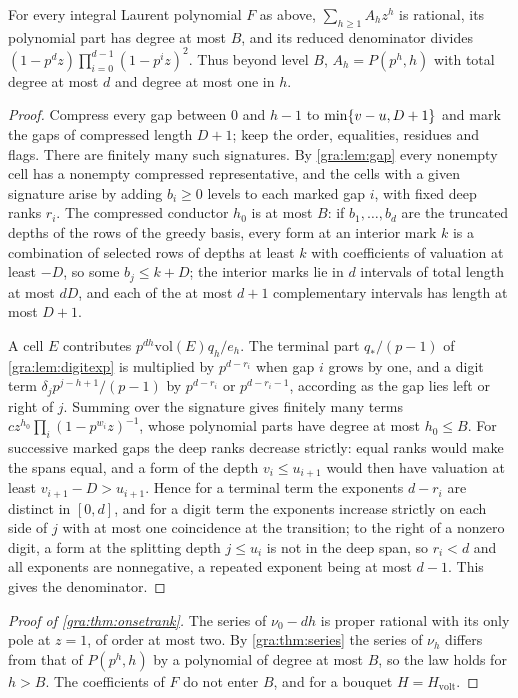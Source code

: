 \begin{theorem}\label{gra:thm:series}
For every integral Laurent polynomial $F$ as above, $\sum_{h\ge1}A_hz^h$ is
rational, its polynomial part has degree at most $B$, and its reduced
denominator divides $(1-p^dz)\prod_{i=0}^{d-1}(1-p^iz)^2$. Thus beyond level
$B$, $A_h=P(p^h,h)$ with total degree at most $d$ and degree at most one in
$h$.
\end{theorem}

\begin{proof}
Compress every gap between $0$ and $h-1$ to $\min\{v-u,D+1\}$ and mark the
gaps of compressed length $D+1$; keep the order, equalities, residues and
flags. There are finitely many such signatures. By \cref{gra:lem:gap} every
nonempty cell has a nonempty compressed representative, and the cells with
a given signature arise by adding $b_i\ge0$ levels to each marked gap $i$,
with fixed deep ranks $r_i$. The compressed conductor $h_0$ is at most $B$:
if $b_1,\dots,b_d$ are the truncated depths of the rows of the greedy basis,
every form at an interior mark $k$ is a combination of selected rows of
depths at least $k$ with coefficients of valuation at least $-D$, so some
$b_j\le k+D$; the interior marks lie in $d$ intervals of total length at
most $dD$, and each of the at most $d+1$ complementary intervals has length
at most $D+1$.

A cell $E$ contributes $p^{dh}\mathrm{vol}(E)q_h/e_h$. The terminal part
$q_*/(p-1)$ of \cref{gra:lem:digitexp} is multiplied by $p^{d-r_i}$ when
gap $i$ grows by one, and a digit term $\delta_jp^{j-h+1}/(p-1)$ by
$p^{d-r_i}$ or $p^{d-r_i-1}$, according as the gap lies left or right of
$j$. Summing over the signature gives finitely many terms
$cz^{h_0}\prod_i(1-p^{w_i}z)^{-1}$, whose polynomial parts have degree at
most $h_0\le B$. For successive marked gaps the deep ranks decrease
strictly: equal ranks would make the spans equal, and a form of the depth
$v_i\le u_{i+1}$ would then have valuation at least $v_{i+1}-D>u_{i+1}$.
Hence for a terminal term the exponents $d-r_i$ are distinct in $[0,d]$,
and for a digit term the exponents increase strictly on each side of $j$
with at most one coincidence at the transition; to the right of a nonzero
digit, a form at the splitting depth $j\le u_i$ is not in the deep span, so
$r_i<d$ and all exponents are nonnegative, a repeated exponent being at
most $d-1$. This gives the denominator.
\end{proof}

\begin{proof}[Proof of \cref{gra:thm:onsetrank}]
The series of $\nu_0-dh$ is proper rational with its only pole at $z=1$, of
order at most two. By \cref{gra:thm:series} the series of $\nu_h$ differs
from that of $P(p^h,h)$ by a polynomial of degree at most $B$, so the law
holds for $h>B$. The coefficients of $F$ do not enter $B$, and for a
bouquet $H=H_{\mathrm{volt}}$.
\end{proof}

